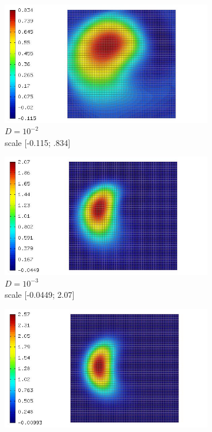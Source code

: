 \documentclass[mathserif]{beamer}
\begin{document}
\begin{frame}
\begin{figure}[H]
\begin{subfigure}[H]{0.02\textwidth}
	\end{subfigure}
	\begin{subfigure}[H]{0.3\textwidth}
		\centering
		\includegraphics[width=.9\textwidth, trim = 65mm 0mm 0mm 0mm, clip]{images/timedep-multiscale/stability/eps=001_100.jpg}
		\vspace{-3mm}
		\caption{$D = 10^{-2}$\\\vspace{-2mm}scale [-0.115; .834]}
	\end{subfigure}
	\begin{subfigure}[H]{0.3\textwidth}
		\centering
		\includegraphics[width=.9\textwidth, trim = 65mm 0mm 0mm 0mm, clip]{images/timedep-multiscale/stability/eps=0001_100.jpg}
		\vspace{-3mm}
		\caption{$D = 10^{-3}$\\\vspace{-2mm}scale [-0.0449; 2.07]}
	\end{subfigure}
	\begin{subfigure}[H]{0.3\textwidth}
		\centering
		\includegraphics[width=.9\textwidth, trim = 65mm 0mm 0mm 0mm, clip]{images/timedep-multiscale/stability/eps=0_100.jpg}

\end{subfigure}
\end{figure}
\end{frame}
\end{document}
